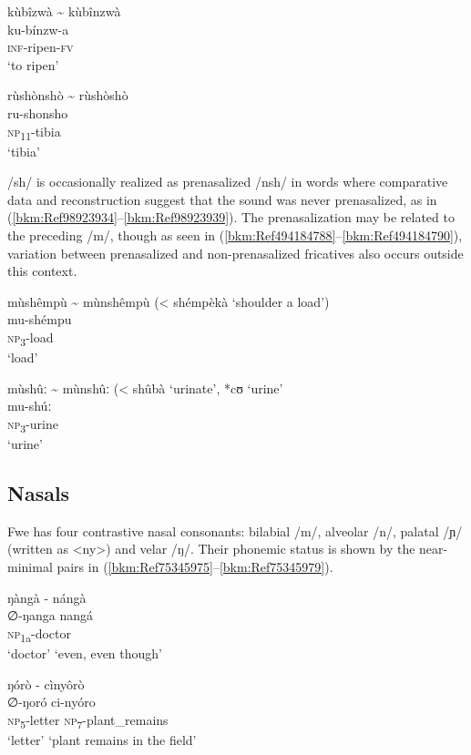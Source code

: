 \ea
kùbîzwà {\textasciitilde} kùbînzwà\\
ku-bínzw-a\\
\textsc{inf}-ripen-\textsc{fv}\\
\glt ‘to ripen’
\z

\ea
\label{bkm:Ref494184790}
rùshònshò {\textasciitilde} rùshòshò\\
ru-shonsho\\
\textsc{np}\textsubscript{11}-tibia\\
\glt ‘tibia’
\z

/sh/ is occasionally realized as prenasalized /nsh/ in words where comparative data and reconstruction suggest that the sound was never prenasalized, as in (\ref{bkm:Ref98923934}--\ref{bkm:Ref98923939}). The prenasalization may be related to the preceding /m/, though as seen in (\ref{bkm:Ref494184788}--\ref{bkm:Ref494184790}), variation between prenasalized and non-prenasalized fricatives also occurs outside this context.

\ea
\label{bkm:Ref98923934}
mùshêmpù {\textasciitilde} mùnshêmpù (< shémpèkà ‘shoulder a load’)\\
mu-shémpu\\
\textsc{np}\textsubscript{3}-load\\
\glt ‘load’
\z

\ea
\label{bkm:Ref98923939}
mùshûː {\textasciitilde} mùnshûː (< shûbà ‘urinate’, *cʊ ‘urine’ \citep{BastinEtAl2002}\\
mu-shúː\\
\textsc{np}\textsubscript{3}-urine\\
\glt ‘urine’
\z
\subsection{Nasals}

Fwe has four contrastive nasal consonants: bilabial /m/, alveolar /n/, palatal /ɲ/ (written as <ny>) and velar /ŋ/. Their phonemic status is shown by the near-minimal pairs in (\ref{bkm:Ref75345975}--\ref{bkm:Ref75345979}).

\ea
\label{bkm:Ref75345975}
ŋàngà  \tab    - \tab  nángà\\
∅-ŋanga   \tab\tab   nangá\\
\textsc{np}\textsubscript{1a}-doctor\\
\glt ‘doctor’  \tab\tab    ‘even, even though’
\z

\ea
ŋórò   \tab   - \tab cìnyôrò\\
∅-ŋoró   \tab\tab   ci-nyóro\\
\textsc{np}\textsubscript{5}-letter   \tab\tab   \textsc{np}\textsubscript{7}-plant\_remains\\
\glt ‘letter’   \tab\tab     ‘plant remains in the field’
\z

